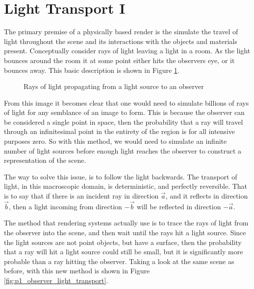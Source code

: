 \documentclass[../pbr.tex]{subfile}
\begin{document}
\section{Light Transport I}%
\label{sec:light_transport_i}

The primary premise of a physically based render is the simulate the travel of
light throughout the scene and its interactions with the objects and materials
present. Conceptually consider rays of light leaving a light in a room. As the
light bounces around the room it at some point either hits the observers eye,
or it bounces away. This basic description is shown in Figure
\ref{fig:p1_light_transport}.

\begin{figure}[htpb]
\begin{center}
\end{center}
\caption{Rays of light propagating from a light source to an observer}%
\label{fig:p1_light_transport}
\end{figure}

From this image it becomes clear that one would need to simulate billions of
rays of light for any semblance of an image to form. This is because the
observer can be considered a single point in space, then the probability that a
ray will travel through an infinitesimal point in the entirety of the region is
for all intensive purposes zero. So with this method, we would need to simulate
an infinite number of light sources before enough light reaches the observer to
construct a representation of the scene.

The way to solve this issue, is to follow the light backwards. The
transport of light, in this macroscopic domain, is deterministic, and perfectly
reversible. That is to say that if there is an incident ray in direction
$\vec{a}$, and it reflects in direction $\vec{b}$, then a light incoming from
direction $-\vec{b}$ will be reflected in direction $-\vec{a}$.

The method that rendering systems actually use is to trace the rays of light
from the observer into the scene, and then wait until the rays hit a light
source. Since the light sources are not point objects, but have a surface, then
the probability that a ray will hit a light source could still be small, but it
is significantly more probable than a ray hitting the observer. Taking a look
at the same scene as before, with this new method is shown in Figure
\ref{fig:p1_observer_light_transport}.
\end{document}
